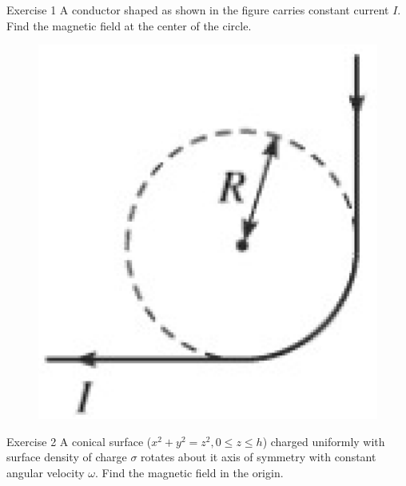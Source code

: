\documentclass{beamer}
\begin{document}
\begin{frame}{Exercise 1}
    A conductor shaped as shown in the figure carries constant current $I$. Find the magnetic field at the center of the circle.
    \vspace{1em}
    \begin{figure}[htbp]
        \centering
        \includegraphics[scale=0.4]{images/e1.png}
    \end{figure}
\end{frame}

\begin{frame}{Exercise 2}
    A conical surface ($x^2 + y^2 = z^2, 0 \le z \le h$) charged uniformly with surface density of charge $\sigma$ rotates about it axis of symmetry with constant angular velocity $\omega$. Find the magnetic field in the origin.
\end{frame}
\end{document}
